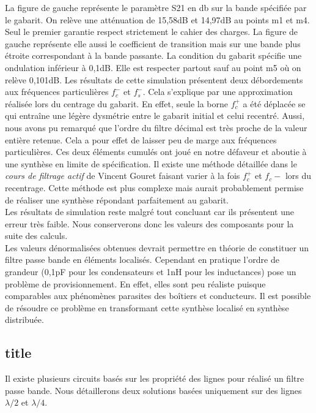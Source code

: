 \documentclass[french]{article}
\begin{document}
La figure de gauche représente le paramètre S21 en db sur la bande spécifiée par le gabarit. On relève une atténuation de 15,58dB et 14,97dB au points m1 et m4. Seul le premier garantie respect strictement le cahier des charges. La figure de gauche représente elle aussi le coefficient de transition mais sur une bande plus étroite correspondant à la bande passante. La condition du gabarit spécifie une ondulation inférieur à 0,1dB. Elle est respecter partout sauf au point m5 où on relève 0,101dB. Les résultats de cette simulation présentent deux débordements aux fréquences particulières $f_c^-$ et $f_s^-$. Cela s'explique par une approximation réalisée lors du centrage du gabarit. En effet, seule la borne $f_c^+$ a été déplacée se qui entraîne une légère dysmétrie entre le gabarit initial et celui recentré. Aussi, nous avons pu remarqué que l'ordre du filtre décimal est très proche de la valeur entière retenue. Cela a pour effet de laisser peu de marge aux fréquences particulières. Ces deux éléments cumulés ont joué en notre défaveur et aboutie à une synthèse en limite de spécification. 
Il existe une méthode détaillée dans le \textit{cours de filtrage actif} de Vincent Gouret faisant varier à la fois $f_c^+$ et $f_c-$ lors du recentrage. Cette méthode est plus complexe mais aurait probablement permise de réaliser une synthèse répondant parfaitement au gabarit.\\
Les résultats de simulation reste malgré tout concluant car ils présentent une erreur très faible. Nous conserverons donc les valeurs des composants pour la suite des calculs.\\

Les valeurs dénormalisées obtenues devrait permettre en théorie de constituer un filtre passe bande en éléments localisés. Cependant en pratique l'ordre de grandeur (0,1pF pour les condensateurs et 1nH pour les inductances) pose un problème de provisionnement. En effet, elles sont peu réaliste puisque comparables aux phénomènes parasites des boîtiers et conducteurs. Il est possible de résoudre ce problème en transformant cette synthèse localisé en synthèse distribuée.

\subsection{title}
Il existe plusieurs circuits basés sur les propriété des lignes pour réalisé un filtre passe bande. Nous détaillerons deux solutions basées uniquement sur des lignes $\lambda /2$ et $\lambda /4$. 
\end{document}
